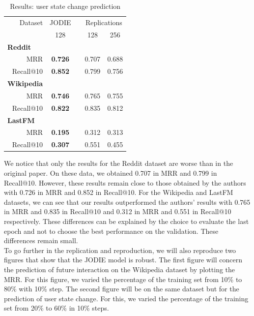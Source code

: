 \begin{table}[H]
    \centering
    \begin{tabular}{@{}rcrrr@{}}
    \toprule
    Dataset\hspace*{3em} & JODIE & \phantom{abc} & \multicolumn{2}{c}{Replications} \\
    \cmidrule{2-2} \cmidrule{4-5}
    & 128 && \multicolumn{1}{c}{128} & \multicolumn{1}{c}{256} \\
    \midrule
    \multicolumn{1}{l}{\textbf{Reddit}} \\
    {\small MRR} & \textbf{0.726}  && 0.707 & 0.688 \\
    {\small Recall@10}  &\textbf{0.852} && 0.799 & 0.756\\
    \multicolumn{1}{l}{\textbf{Wikipedia}}\\
    {\small MRR} &\textbf{0.746} && 0.765 &  0.755  \\
    {\small Recall@10}  & \textbf{0.822} && 0.835 & 0.812\\
    \multicolumn{1}{l}{\textbf{LastFM}} \\
    {\small MRR} &\textbf{0.195} && 0.312 & 0.313 \\
    {\small Recall@10}  & \textbf{0.307} && 0.551 & 0.455\\
    \bottomrule
    \end{tabular}
    \caption{Results: user state change prediction}
\end{table}

We notice that only the results for the Reddit dataset are worse than in the original paper. On these data, we obtained 0.707 in MRR and 0.799 in Recall@10. However, these results remain close to those obtained by the authors with 0.726 in MRR and 0.852 in Recall@10. For the Wikipedia and LastFM datasets, we can see that our results outperformed the authors' results with 0.765 in MRR and 0.835 in Recall@10 and 0.312 in MRR and 0.551 in Recall@10 respectively. These differences can be explained by the choice to evaluate the last epoch and not to choose the best performance on the validation. These differences remain small.\\

To go further in the replication and reproduction, we will also reproduce two figures that show that the JODIE model is robust. The first figure will concern the prediction of future interaction on the Wikipedia dataset by plotting the MRR. For this figure, we varied the percentage of the training set from 10\% to 80\% with 10\% step. The second figure will be on the same dataset but for the prediction of user state change. For this, we varied the percentage of the training set from 20\% to 60\% in 10\% steps.

